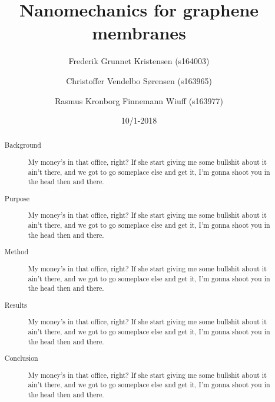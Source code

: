 



\begin{abstract}
  \begin{description}
    \item[Background] My money's in that office, right? If she start giving me some bullshit about it ain't there, and we got to go someplace else and get it, I'm gonna shoot you in the head then and there.
    \item[Purpose] My money's in that office, right? If she start giving me some bullshit about it ain't there, and we got to go someplace else and get it, I'm gonna shoot you in the head then and there.
    \item[Method] My money's in that office, right? If she start giving me some bullshit about it ain't there, and we got to go someplace else and get it, I'm gonna shoot you in the head then and there.
    \item[Results] My money's in that office, right? If she start giving me some bullshit about it ain't there, and we got to go someplace else and get it, I'm gonna shoot you in the head then and there.
    \item[Conclusion] My money's in that office, right? If she start giving me some bullshit about it ain't there, and we got to go someplace else and get it, I'm gonna shoot you in the head then and there.
  \end{description}
\end{abstract}

\title{Nanomechanics for graphene membranes}
\date{10/1-2018}
\author{Frederik Grunnet Kristensen (s164003)}
\author{Christoffer Vendelbo Sørensen (s163965)}
\author{Rasmus Kronborg Finnemann Wiuff (s163977)}

\maketitle


\tableofcontents
\thispagestyle{empty}
\newpage
\setcounter{page}{1}


\newpage




\newpage
\listoffigures
\listoftables
\newpage


